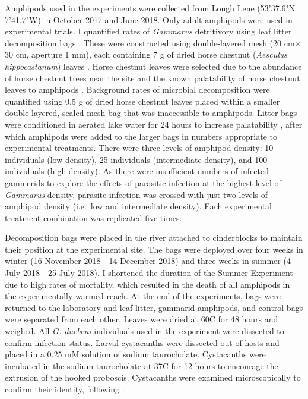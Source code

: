 Amphipods used in the experiments were collected from Lough Lene \linebreak(53'37.6"N 7'41.7"W) in October 2017 and June 2018. Only adult amphipods were used in experimental trials. I quantified rates of \emph{Gammarus} detritivory using leaf litter decomposition bags \citep{benfield2006}. These were constructed using double-layered mesh (20 cm$\times$30 cm, aperture 1 mm), each containing 7 g of dried horse chestnut (\emph{Aesculus hippocastanum}) leaves \citep{agatz2014}. Horse chestnut leaves were selected due to the abundance of horse chestnut trees near the site and the known palatability of horse chestnut leaves to amphipods \citep{agatz2014}. Background rates of microbial decomposition were quantified using 0.5 g of dried horse chestnut leaves placed within a smaller double-layered, sealed mesh bag that was inaccessible to amphipods. Litter bags were conditioned in aerated lake water for 24 hours to increase palatability \citep{graca1993, agatz2014}, after which amphipods were added to the larger bags in numbers appropriate to experimental treatments. There were three levels of amphipod density: 10 individuals (low density), 25 individuals (intermediate density), and 100 individuals (high density). As there were insufficient numbers of infected gammerids to explore the effects of parasitic infection at the highest level of \emph{Gammarus} density, parasite infection was crossed with just two levels of amphipod density (i.e.\ low and intermediate density). Each experimental treatment combination was replicated five times.

Decomposition bags were placed in the river attached to cinderblocks to maintain their position at the experimental site. The bags were deployed over four weeks in winter (16 November 2018 - 14 December 2018) and three weeks in summer (4 July 2018 - 25 July 2018). I shortened the duration of the Summer Experiment due to high rates of mortality, which resulted in the death of all amphipods in the experimentally warmed reach. At the end of the experiments, bags were returned to the laboratory and leaf litter, gammarid amphipods, and control bags were separated from each other. Leaves were dried at 60\degree C for 48 hours and weighed. All \emph{G. duebeni} individuals used in the experiment were dissected to confirm infection status. Larval cystacanths were dissected out of hosts and placed in a 0.25 mM solution of sodium taurocholate. Cystacanths were incubated in the sodium taurocholate at 37\degree C for 12 hours to encourage the extrusion of the hooked proboscis. Cystacanths were examined microscopically to confirm their identity, following \citet{mcdonald1988}.

